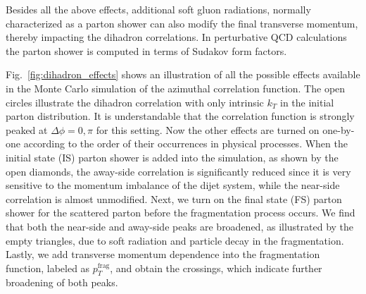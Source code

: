 Besides all the above effects, additional soft gluon radiations, normally 
characterized as a parton shower can also modify the final transverse
momentum, thereby impacting the dihadron correlations. In perturbative QCD
calculations the parton shower is computed in terms of Sudakov
form factors.

Fig.~\ref{fig:dihadron_effects} shows an illustration of all the possible
effects available in the Monte Carlo simulation of the azimuthal correlation
function. The open circles illustrate the dihadron correlation with only
intrinsic $k_T$ in the initial parton distribution. It is understandable that the
correlation function is strongly peaked at $\Delta \phi =0, \pi$ for this setting.
Now the other effects are turned on one-by-one according to the order of their
occurrences in physical processes. When the initial state (IS) parton shower
is added into the simulation, as shown by the open diamonds, the away-side
correlation is significantly reduced since it is very sensitive to the momentum
imbalance of the dijet system, while the near-side correlation is almost
unmodified. Next, we turn on the final state (FS) parton shower for the scattered 
parton before the fragmentation process occurs. We find that both the
near-side and away-side peaks are broadened, as illustrated by the empty triangles,
due to soft radiation and particle decay in the fragmentation. 
Lastly, we add transverse momentum dependence into the fragmentation 
function, labeled as $p_T^{\textrm{frag}}$, and obtain the crossings, which indicate further broadening of both peaks.

